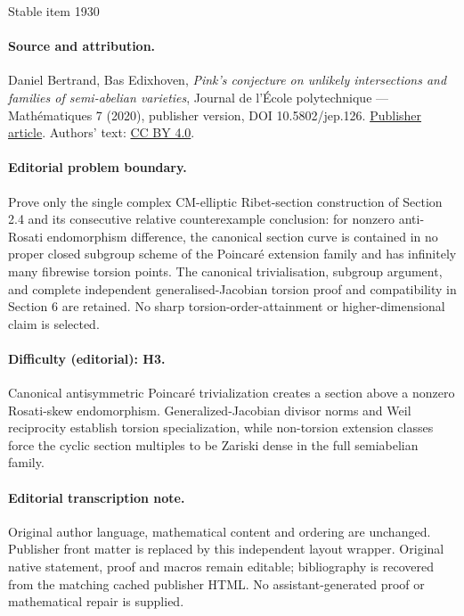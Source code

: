 \documentclass[11pt]{article}
\theoremstyle{plain}
\theoremstyle{definition}
\numberwithin{equation}{subsection}
\begin{document}
\begin{center}{\Large Stable item 1930}\end{center}
\paragraph{Source and attribution.}
Daniel Bertrand, Bas Edixhoven, \emph{Pink’s conjecture on unlikely intersections and families of semi-abelian varieties}, Journal de l’École polytechnique — Mathématiques 7 (2020), publisher version, DOI 10.5802/jep.126. \href{https://jep.centre-mersenne.org/articles/10.5802/jep.126/}{Publisher article}. Authors' text: \href{https://creativecommons.org/licenses/by/4.0/}{CC BY 4.0}.
\paragraph{Editorial problem boundary.}
Prove only the single complex CM-elliptic Ribet-section construction of Section 2.4 and its consecutive relative counterexample conclusion: for nonzero anti-Rosati endomorphism difference, the canonical section curve is contained in no proper closed subgroup scheme of the Poincaré extension family and has infinitely many fibrewise torsion points. The canonical trivialisation, subgroup argument, and complete independent generalised-Jacobian torsion proof and compatibility in Section 6 are retained. No sharp torsion-order-attainment or higher-dimensional claim is selected.
\paragraph{Difficulty (editorial): H3.}
Canonical antisymmetric Poincaré trivialization creates a section above a nonzero Rosati-skew endomorphism. Generalized-Jacobian divisor norms and Weil reciprocity establish torsion specialization, while non-torsion extension classes force the cyclic section multiples to be Zariski dense in the full semiabelian family.
\paragraph{Editorial transcription note.}
Original author language, mathematical content and ordering are unchanged. Publisher front matter is replaced by this independent layout wrapper. Original native statement, proof and macros remain editable; bibliography is recovered from the matching cached publisher HTML. No assistant-generated proof or mathematical repair is supplied.
\clearpage
\end{document}
